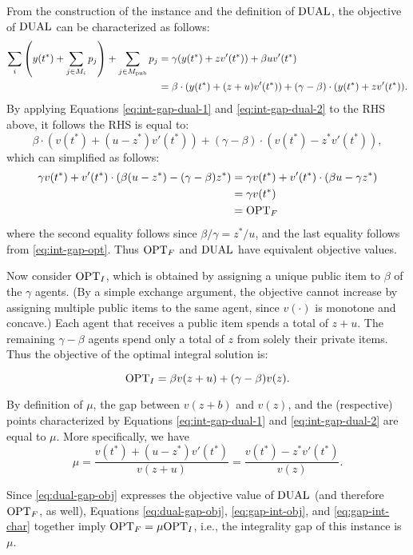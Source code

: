 From the construction of the instance and the definition of $\mathrm{DUAL}$, the objective of $\mathrm{DUAL}$ can be characterized as follows:
\begin{align*}
\sum_i \left(y(t^*) + \sum_{j \in M_i} p_j\right) + \sum_{j \in M_{\mathrm{pub}}}p_j & = \gamma  (y(t^*) + z  v'(t^*)) +  \beta u v'(t^*) \\ 
& = \beta \cdot (y(t^*) + (z +u) v'(t^*)) +  (\gamma - \beta) \cdot (y(t^*) + zv'(t^*)).
\end{align*}
By applying Equations \eqref{eq:int-gap-dual-1} and \eqref{eq:int-gap-dual-2} to the RHS above, it follows the RHS is equal to: 
\begin{equation}
\label{eq:dual-gap-obj}
\beta \cdot (v(t^*) + (u-z^*)v'(t^*)) + (\gamma-\beta) \cdot (v(t^*)-z^* v'(t^*)), 
\end{equation}
which can simplified as follows:
\begin{align*} 
\gamma v(t^*) + v'(t^*) \cdot (\beta(u-z^*) -(\gamma-\beta)z^*)  & = \gamma v(t^*) + v'(t^*) \cdot (\beta u - \gamma z^*)  \\
& = \gamma v(t^*) \\
& = \mathrm{OPT}_F
\end{align*}
where the second equality follows since $\beta/\gamma = z^*/u$, and the last equality follows from \eqref{eq:int-gap-opt}.
Thus $\mathrm{OPT}_F$ and $\mathrm{DUAL}$ have equivalent objective values. 


Now consider $\mathrm{OPT}_I$, which is obtained by assigning a unique public item to $\beta$ of the $\gamma$ agents.
(By a simple exchange argument, the objective cannot increase by assigning multiple public items to the same agent, since $v(\cdot)$ is monotone and concave.)
Each agent that receives a public item spends a total of $z + u$. 
The remaining $\gamma - \beta$ agents spend only a  total of $z$ from solely their private items. 
Thus the objective of the optimal integral solution is:


\begin{equation}
\label{eq:gap-int-obj}
\mathrm{OPT}_I = \beta v(z+u) + (\gamma-\beta) v(z).
\end{equation}

By definition of $\mu$, the gap between $v(z+b)$ and $v(z)$, and the (respective) points 
characterized by Equations \eqref{eq:int-gap-dual-1} and \eqref{eq:int-gap-dual-2} are equal to $\mu$. More specifically, we have
\begin{equation}
\label{eq:gap-int-char}
 \mu = \frac{v(t^*) + (u-z^*)v'(t^*)}{v(z+u)} = \frac{v(t^*) - z^*v'(t^*)}{v(z)}.
\end{equation}

Since \eqref{eq:dual-gap-obj} expresses the objective value of $\mathrm{DUAL}$ (and therefore $\mathrm{OPT}_F$, as well), 
Equations \eqref{eq:dual-gap-obj}, \eqref{eq:gap-int-obj}, and \eqref{eq:gap-int-char} together imply $\mathrm{OPT}_F = \mu\mathrm{OPT}_I$, i.e., the integrality gap of this instance is $\mu$.


